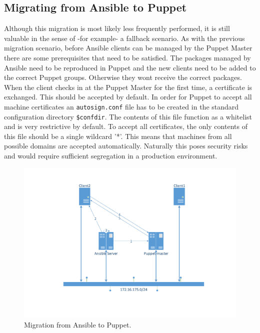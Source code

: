 \subsection{Migrating from Ansible to Puppet}\label{subsec:ansibletopuppet}
Although this migration is most likely less frequently performed, it is still valuable in the sense of -for example-  a fallback scenario. As with the previous migration scenario, before Ansible clients can be managed by the Puppet Master there are some prerequisites that need to be satisfied. The packages managed by Ansible need to be reproduced in Puppet and the new clients need to be added to the correct Puppet groups. Otherwise they wont receive the correct packages. When the client checks in at the Puppet Master for the first time, a certificate is exchanged. This should be accepted by default. In order for Puppet to accept all machine certificates an \texttt{autosign.conf} file has to be created in the standard configuration directory \texttt{\$confdir}. The contents of this file function as a whitelist and is very restrictive by default. To accept all certificates, the only contents of this file should be a single wildcard '*'. This means that machines from all possible domains are accepted automatically. Naturally this poses security risks and would require sufficient segregation in a production environment. 

\begin{figure}[!h]
        \includegraphics[scale=0.5]{img/AnsibletoPuppet.pdf}
        \caption{Migration from Ansible to Puppet.}
        \label{fig:situation2}
\end{figure}

